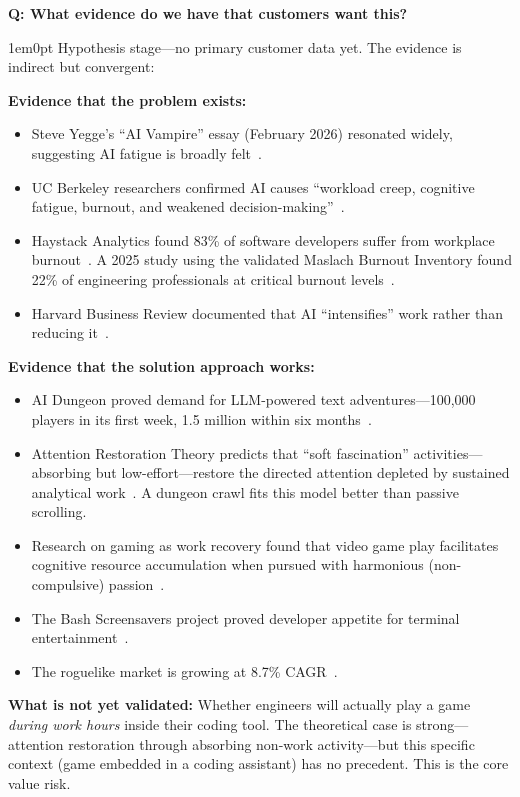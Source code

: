 \documentclass[11pt,letterpaper]{article}
\newcounter{faqnum}
\newenvironment{faqpair}[1]{%
  \needspace{4\baselineskip}%
  \vspace{0.5em}%
  \refstepcounter{faqnum}%
  \noindent\textbf{\color{SectionBlue}Q\thefaqnum: #1}\par\nopagebreak[4]%
  \vspace{0.2em}%
  \begin{adjustwidth}{1em}{0pt}%
  \setlength{\parindent}{0pt}%
}{%
  \end{adjustwidth}%
  \vspace{0.5em}%
}
\begin{document}
\begin{faqpair}{What evidence do we have that customers want this?}\label{faq:customer-evidence}
  Hypothesis stage---no primary customer data yet. The evidence is indirect but convergent:

  \textbf{Evidence that the problem exists:}
  \begin{itemize}[nosep]
    \item Steve Yegge's ``AI Vampire'' essay (February 2026) resonated widely, suggesting AI fatigue is broadly felt~\cite{yegge2026aivampire}.
    \item UC Berkeley researchers confirmed AI causes ``workload creep, cognitive fatigue, burnout, and weakened decision-making''~\cite{fortune2026ucberkeley}.
    \item Haystack Analytics found 83\% of software developers suffer from workplace burnout~\cite{haystack2021burnout}. A 2025 study using the validated Maslach Burnout Inventory found 22\% of engineering professionals at critical burnout levels~\cite{leaddev2025burnout}.
    \item Harvard Business Review documented that AI ``intensifies'' work rather than reducing it~\cite{hbr2026aiintensifies}.
  \end{itemize}

  \textbf{Evidence that the solution approach works:}
  \begin{itemize}[nosep]
    \item AI Dungeon proved demand for LLM-powered text adventures---100,000 players in its first week, 1.5 million within six months~\cite{aidungeon2019, wikipedia2024aidungeon}.
    \item Attention Restoration Theory predicts that ``soft fascination'' activities---absorbing but low-effort---restore the directed attention depleted by sustained analytical work~\cite{kaplan1995art}. A dungeon crawl fits this model better than passive scrolling.
    \item Research on gaming as work recovery found that video game play facilitates cognitive resource accumulation when pursued with harmonious (non-compulsive) passion~\cite{kocak2024gaming}.
    \item The Bash Screensavers project proved developer appetite for terminal entertainment~\cite{biggo2025bashscreensavers}.
    \item The roguelike market is growing at 8.7\% CAGR~\cite{datainsights2025roguelike}.
  \end{itemize}

  \textbf{What is not yet validated:} Whether engineers will actually play a game \emph{during work hours} inside their coding tool. The theoretical case is strong---attention restoration through absorbing non-work activity---but this specific context (game embedded in a coding assistant) has no precedent. This is the core value risk.
\end{faqpair}
\end{document}
